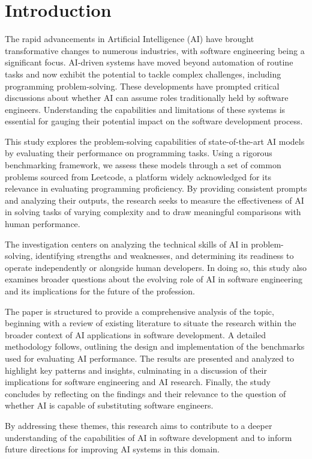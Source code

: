\section{Introduction}

The rapid advancements in Artificial Intelligence (AI) have brought transformative changes to numerous industries, with software engineering being a significant focus. AI-driven systems have moved beyond automation of routine tasks and now exhibit the potential to tackle complex challenges, including programming problem-solving. These developments have prompted critical discussions about whether AI can assume roles traditionally held by software engineers. Understanding the capabilities and limitations of these systems is essential for gauging their potential impact on the software development process.

This study explores the problem-solving capabilities of state-of-the-art AI models by evaluating their performance on programming tasks. Using a rigorous benchmarking framework, we assess these models through a set of common problems sourced from Leetcode, a platform widely acknowledged for its relevance in evaluating programming proficiency. By providing consistent prompts and analyzing their outputs, the research seeks to measure the effectiveness of AI in solving tasks of varying complexity and to draw meaningful comparisons with human performance.

The investigation centers on analyzing the technical skills of AI in problem-solving, identifying strengths and weaknesses, and determining its readiness to operate independently or alongside human developers. In doing so, this study also examines broader questions about the evolving role of AI in software engineering and its implications for the future of the profession.

The paper is structured to provide a comprehensive analysis of the topic, beginning with a review of existing literature to situate the research within the broader context of AI applications in software development. A detailed methodology follows, outlining the design and implementation of the benchmarks used for evaluating AI performance. The results are presented and analyzed to highlight key patterns and insights, culminating in a discussion of their implications for software engineering and AI research. Finally, the study concludes by reflecting on the findings and their relevance to the question of whether AI is capable of substituting software engineers.

By addressing these themes, this research aims to contribute to a deeper understanding of the capabilities of AI in software development and to inform future directions for improving AI systems in this domain.
